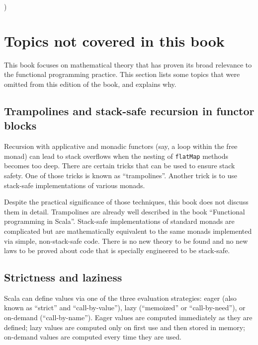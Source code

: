 \setcounter{secnumdepth}{3}%

)

\section{Topics not covered in this book}

This book focuses on mathematical theory that has proven its broad
relevance to the functional programming practice. This section lists
some topics that were omitted from this edition of the book, and explains
why.

\subsection{Trampolines and stack-safe recursion in functor blocks}

Recursion with applicative and monadic functors (say, a loop within
the free monad) can lead to stack overflows when the nesting of \lstinline!flatMap!
methods becomes too deep. There are certain tricks that can be used
to ensure stack safety. One of those tricks is known as \textsf{``}trampolines\textsf{''}.
Another trick is to use stack-safe implementations of various monads. 

Despite the practical significance of those techniques, this book
does not discuss them in detail. Trampolines are already well described
in the book \textsf{``}Functional programming in Scala\textsf{''}. Stack-safe implementations
of standard monads are complicated but are mathematically equivalent
to the same monads implemented via simple, non-stack-safe code. There
is no new theory to be found and no new laws to be proved about code
that is specially engineered to be stack-safe.

\subsection{Strictness and laziness}

Scala can define values via one of the three evaluation strategies:
eager (also known as \textsf{``}strict\textsf{''} and \textsf{``}call-by-value\textsf{''}), lazy (\textsf{``}memoized\textsf{''}
or \textsf{``}call-by-need\textsf{''}), or on-demand (\textsf{``}call-by-name\textsf{''}). Eager values
are computed immediately as they are defined; lazy values are computed
only on first use and then stored in memory; on-demand values are
computed every time they are used. 

